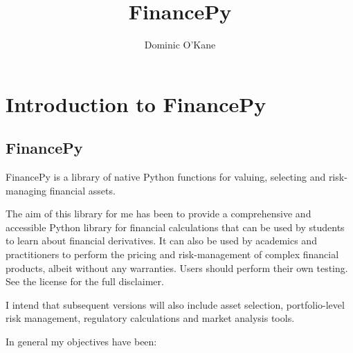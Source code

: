 \documentclass[twoside,11pt]{book}
\begin{document}
\title{{\Huge \bf FinancePy}}
\author{Dominic O'Kane}

\maketitle 

\cleardoublepage

\setcounter{tocdepth}{1}
\tableofcontents

\setcounter{page}{1}

\chapter{Introduction to FinancePy}

\section*{FinancePy}
FinancePy is a library of native Python functions for valuing, selecting and risk-managing financial assets. 

The aim of this library for me has been to provide a comprehensive and accessible Python library for financial calculations that can be used by students to learn about financial derivatives. It can also be used by academics and practitioners to perform the pricing and risk-management of complex financial products, albeit without any warranties. Users should perform their own testing. See the license for the full disclaimer.

I intend that subsequent versions will also include asset selection, portfolio-level risk management, regulatory calculations and market analysis tools.

In general my objectives have been:
\end{document}

